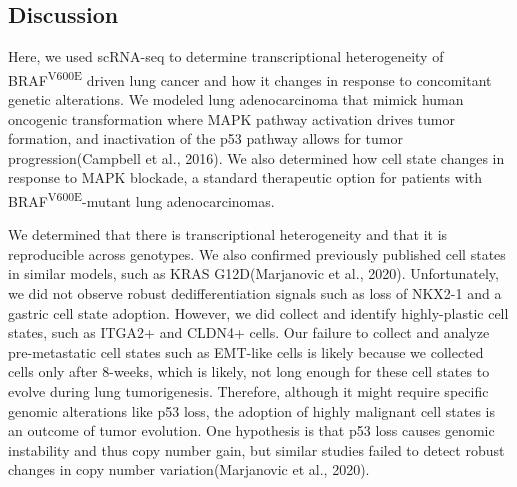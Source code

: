 \hypertarget{discussion-2}{%
\subsection{Discussion}\label{discussion-2}}

Here, we used scRNA-seq to determine transcriptional heterogeneity of BRAF\textsuperscript{V600E} driven lung cancer and how it changes in response to concomitant genetic alterations. We modeled lung adenocarcinoma that mimick human oncogenic transformation where MAPK pathway activation drives tumor formation, and inactivation of the p53 pathway allows for tumor progression(Campbell et al., 2016). We also determined how cell state changes in response to MAPK blockade, a standard therapeutic option for patients with BRAF\textsuperscript{V600E}-mutant lung adenocarcinomas.

We determined that there is transcriptional heterogeneity and that it is reproducible across genotypes. We also confirmed previously published cell states in similar models, such as KRAS G12D(Marjanovic et al., 2020). Unfortunately, we did not observe robust dedifferentiation signals such as loss of NKX2-1 and a gastric cell state adoption. However, we did collect and identify highly-plastic cell states, such as ITGA2+ and CLDN4+ cells. Our failure to collect and analyze pre-metastatic cell states such as EMT-like cells is likely because we collected cells only after 8-weeks, which is likely, not long enough for these cell states to evolve during lung tumorigenesis. Therefore, although it might require specific genomic alterations like p53 loss, the adoption of highly malignant cell states is an outcome of tumor evolution. One hypothesis is that p53 loss causes genomic instability and thus copy number gain, but similar studies failed to detect robust changes in copy number variation(Marjanovic et al., 2020).


